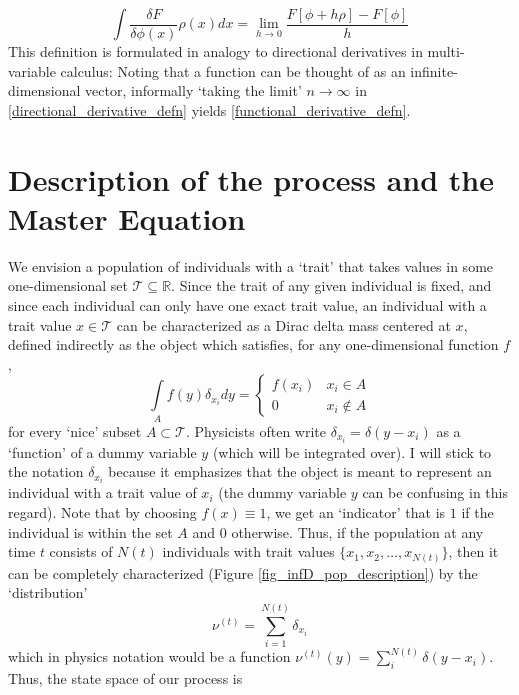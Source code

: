 \begin{equation}
\label{functional_derivative_defn}
    \int\frac{\delta F}{\delta \phi(x)}\rho(x)dx = \lim_{h \to 0} \frac{F[\phi + h\rho]-F[\phi]}{h}
\end{equation}
This definition is formulated in analogy to directional derivatives in multi-variable calculus: Noting that a function can be thought of as an infinite-dimensional vector, informally `taking the limit' $n \to \infty$ in \eqref{directional_derivative_defn} yields \eqref{functional_derivative_defn}.

\section{Description of the process and the Master Equation}
We envision a population of individuals with a `trait' that takes values in some one-dimensional set $\mathcal{T} \subseteq \mathbb{R}$. Since the trait of any given individual is fixed, and since each individual can only have one exact trait value, an individual with a trait value $x \in \mathcal{T}$ can be characterized as a Dirac delta mass centered at $x$, defined indirectly as the object which satisfies, for any one-dimensional function $f$,
\begin{equation*}
    \int\limits_{A}f(y)\delta_{x_i}dy = 
    \begin{cases}
        f(x_i) & x_i \in A\\
        0 & x_i \notin A 
    \end{cases}
\end{equation*}
for every `nice' subset $A \subset \mathcal{T}$. Physicists often write $\delta_{x_i} = \delta(y-x_i)$ as a `function' of a dummy variable $y$ (which will be integrated over). I will stick to the notation $\delta_{x_i}$ because it emphasizes that the object is meant to represent an individual with a trait value of $x_i$ (the dummy variable $y$ can be confusing in this regard). Note that by choosing $f(x) \equiv 1$, we get an `indicator' that is $1$ if the individual is within the set $A$ and $0$ otherwise. Thus, if the population at any time $t$ consists of $N(t)$ individuals with trait values $\{x_1,x_2,\ldots,x_{N(t)}\}$, then it can be completely characterized (Figure \ref{fig_infD_pop_description}) by the `distribution'
\begin{equation*}
    \nu^{(t)} = \sum\limits_{i=1}^{N(t)}\delta_{x_i}
\end{equation*}
which in physics notation would be a function $\nu^{(t)}(y) = \sum_{i}^{N(t)} \delta(y-x_i)$. Thus, the state space of our process is
